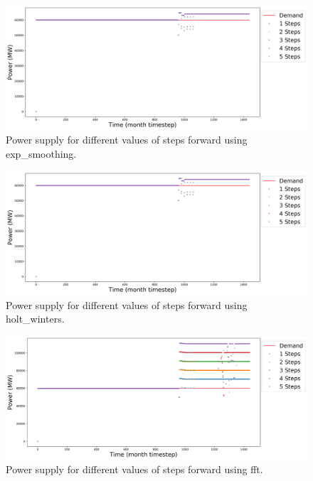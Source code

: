 \documentclass[11pt]{article}
\begin{document}
\begin{figure}[!h]
	\centering
	\includegraphics[width=\textwidth]{29-figures/29-power-buffer0-exp_smoothing-steps.png} 
	\hfill
	\caption{Power supply for different values of steps forward using exp\_smoothing.}
	\label{fig:29-ste-exp_smoothing}
\end{figure}

\begin{figure}[!h]
	\centering
	\includegraphics[width=\textwidth]{29-figures/29-power-buffer0-holt_winters-steps.png} 
	\hfill
	\caption{Power supply for different values of steps forward using holt\_winters.}
	\label{fig:29-ste-hots_winters}
\end{figure}

\begin{figure}[!h]
	\centering
	\includegraphics[width=\textwidth]{29-figures/29-power-buffer0-fft-steps.png} 
	\hfill
	\caption{Power supply for different values of steps forward using fft.}
	\label{fig:29-ste-fft}
\end{figure}
\end{document}

